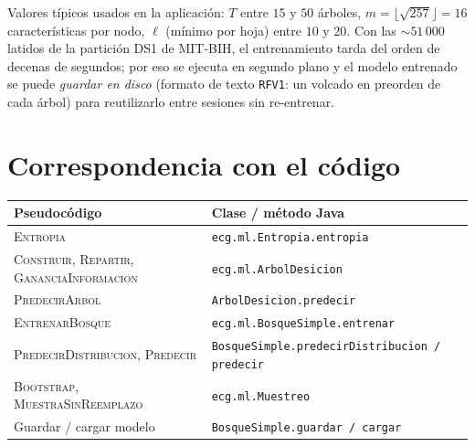 \documentclass[11pt,a4paper]{article}
\begin{document}
Valores típicos usados en la aplicación: $T$ entre $15$ y $50$ árboles,
$m = \lfloor \sqrt{257} \rfloor = 16$ características por nodo, $\ell$ (mínimo por hoja) entre
$10$ y $20$. Con las $\sim\!51\,000$ latidos de la partición DS1 de MIT-BIH, el entrenamiento
tarda del orden de decenas de segundos; por eso se ejecuta en segundo plano y el modelo
entrenado se puede \emph{guardar en disco} (formato de texto \texttt{RFV1}: un volcado en
preorden de cada árbol) para reutilizarlo entre sesiones sin re-entrenar.

\section{Correspondencia con el código}

\begin{tabular}{@{}ll@{}}
\textbf{Pseudocódigo} & \textbf{Clase / método Java} \\
\hline
\textsc{Entropia} & \texttt{ecg.ml.Entropia.entropia} \\
\textsc{Construir}, \textsc{Repartir}, \textsc{GananciaInformacion} & \texttt{ecg.ml.ArbolDesicion} \\
\textsc{PredecirArbol} & \texttt{ArbolDesicion.predecir} \\
\textsc{EntrenarBosque} & \texttt{ecg.ml.BosqueSimple.entrenar} \\
\textsc{PredecirDistribucion}, \textsc{Predecir} & \texttt{BosqueSimple.predecirDistribucion / predecir} \\
\textsc{Bootstrap}, \textsc{MuestraSinReemplazo} & \texttt{ecg.ml.Muestreo} \\
Guardar / cargar modelo & \texttt{BosqueSimple.guardar / cargar} \\
\end{tabular}
\end{document}
